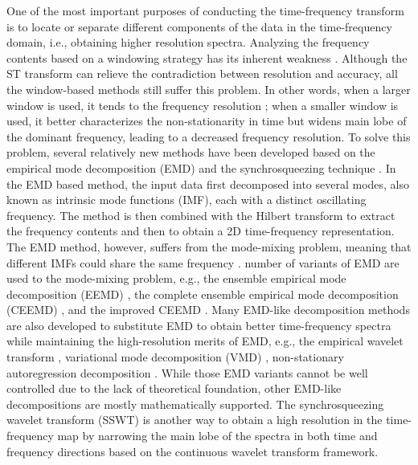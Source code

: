 One of the most important purposes of conducting the time-frequency transform is to locate or separate different components of the data in the time-frequency domain, i.e., obtaining higher resolution spectra.  Analyzing the frequency contents based on a windowing strategy has its inherent weakness . Although the ST transform can relieve the contradiction between resolution and accuracy, all the window-based methods still suffer  this problem. In other words, when a larger window is used, it tends to  the frequency resolution ; when a smaller window is used, it better characterizes the non-stationarity in time but widens  main lobe of the dominant frequency, leading to a decreased frequency resolution. To solve this problem, several relatively new methods have been developed based on the empirical mode decomposition (EMD) \cite[]{huangemd} and the synchrosqueezing technique \cite[]{daubechies2011}. In the EMD based method, the input data  first decomposed into several modes, also known as intrinsic mode functions (IMF), each with a distinct oscillating frequency. The method is then combined with the Hilbert transform to extract the frequency contents and then to obtain a 2D time-frequency representation. The EMD method, however, suffers from the mode-mixing problem, meaning that different IMFs could share the same frequency .  number of variants of EMD are used to  the mode-mixing problem, e.g., the ensemble empirical mode decomposition (EEMD) \cite[]{eemd}, the complete ensemble empirical mode decomposition (CEEMD)  \cite[]{torres2011complete}, and the improved CEEMD \cite[]{colominas2014improved}. Many EMD-like decomposition methods are also developed to substitute EMD to obtain better time-frequency spectra while maintaining the high-resolution merits of EMD, e.g., the empirical wavelet transform \cite[]{liuwei2016ewt,liuwei2019ewt}, variational mode decomposition (VMD) \cite[]{vmd2014,liuwei2016vmd,liuwei2018tgrs}, non-stationary autoregression decomposition \cite[]{fomel20132,guoning2018} . While those EMD variants cannot be well controlled due to the lack of theoretical foundation, other EMD-like decompositions are mostly mathematically supported.  The synchrosqueezing wavelet transform (SSWT) \cite[]{daubechies2011,mostafa2016geo,mostafa2017geo} is another way to obtain a high resolution in the time-frequency map by narrowing the main lobe of the spectra in both time and frequency directions based on the continuous wavelet transform framework.


